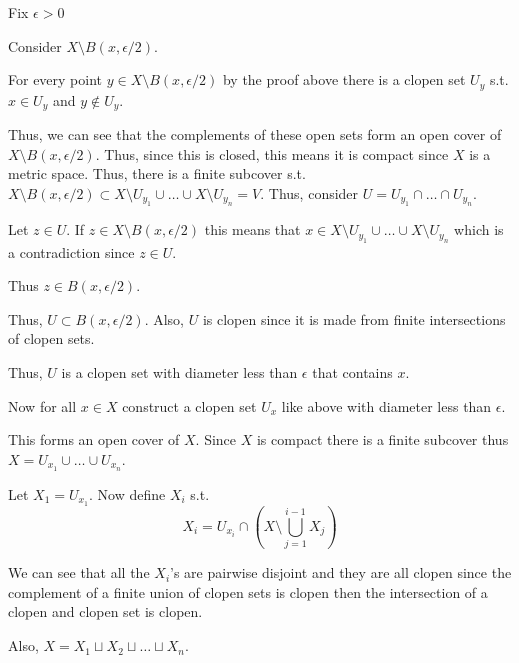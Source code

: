 \documentclass[12pt, letterpaper]{article}
\begin{document}
\begin{problemproof}
    

    Fix $\epsilon > 0$

    Consider $X \setminus B(x,\epsilon/2)$.

    For every point $y \in X \setminus B(x,\epsilon/2)$ by the proof above there is a clopen set $U_y$ s.t. $x \in U_y$ and $y \notin U_y$.

    Thus, we can see that the complements of these open sets form an open cover of $X \setminus B(x,\epsilon/2)$. Thus, since this is closed, this means it is compact since $X$ is a metric space. 
    Thus, there is a finite subcover s.t. $X \setminus B(x,\epsilon/2) \subset X \setminus U_{y_1} \cup \dots \cup X \setminus U_{y_n}=V$. Thus, consider $U=U_{y_1} \cap \dots \cap U_{y_n}$. 

    Let $z \in U$. If $z \in X \setminus B(x,\epsilon/2)$ this means that $x \in X \setminus U_{y_1} \cup \dots \cup X \setminus U_{y_n}$ which is a contradiction since $z \in U$.

    Thus $z \in B(x,\epsilon/2)$.

    Thus, $U \subset B(x,\epsilon/2)$. Also, $U$ is clopen since it is made from finite intersections of clopen sets.

    Thus, $U$ is a clopen set with diameter less than $\epsilon$ that contains $x$.

    Now for all $x \in X$ construct a clopen set $U_x$ like above with diameter less than $\epsilon$.

    This forms an open cover of $X$. Since $X$ is compact there is a finite subcover thus $X = U_{x_1} \cup \dots \cup U_{x_n}$.

    Let $X_1=U_{x_1}$. Now define $X_i$ s.t.
    \[X_i=U_{x_i} \cap (X \setminus \bigcup_{j=1}^{i-1}X_j)\]

    We can see that all the $X_i$'s are pairwise disjoint and they are all clopen since the complement of a finite union of clopen sets is clopen then the intersection of a clopen and clopen set is clopen.

    Also, $X = X_1 \sqcup X_2 \sqcup \dots \sqcup X_n$.
\end{problemproof}
\end{document}
